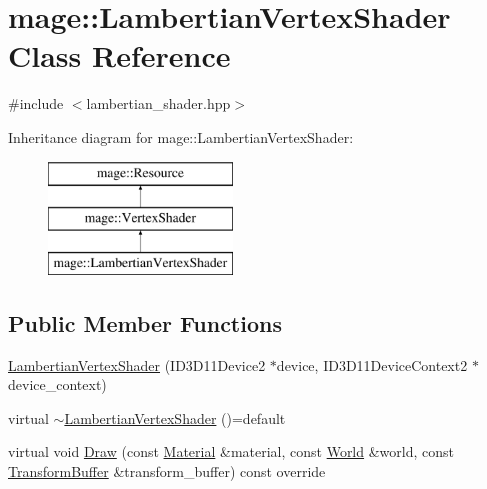 \hypertarget{classmage_1_1_lambertian_vertex_shader}{}\section{mage\+:\+:Lambertian\+Vertex\+Shader Class Reference}
\label{classmage_1_1_lambertian_vertex_shader}


{\ttfamily \#include $<$lambertian\+\_\+shader.\+hpp$>$}

Inheritance diagram for mage\+:\+:Lambertian\+Vertex\+Shader\+:\begin{figure}[H]
\begin{center}
\leavevmode
\includegraphics[height=3.000000cm]{classmage_1_1_lambertian_vertex_shader}
\end{center}
\end{figure}
\subsection*{Public Member Functions}
\begin{DoxyCompactItemize}
\item 
\hyperlink{classmage_1_1_lambertian_vertex_shader_a07be678df09024a53b3f5fc323a7f793}{Lambertian\+Vertex\+Shader} (I\+D3\+D11\+Device2 $\ast$device, I\+D3\+D11\+Device\+Context2 $\ast$device\+\_\+context)
\item 
virtual \hyperlink{classmage_1_1_lambertian_vertex_shader_a55636fd3817b97b6529690d6e3e5cd46}{$\sim$\+Lambertian\+Vertex\+Shader} ()=default
\item 
virtual void \hyperlink{classmage_1_1_lambertian_vertex_shader_a754fa599b43ba29b83b4b255f140c6de}{Draw} (const \hyperlink{structmage_1_1_material}{Material} \&material, const \hyperlink{classmage_1_1_world}{World} \&world, const \hyperlink{structmage_1_1_transform_buffer}{Transform\+Buffer} \&transform\+\_\+buffer) const override
\end{DoxyCompactItemize}
